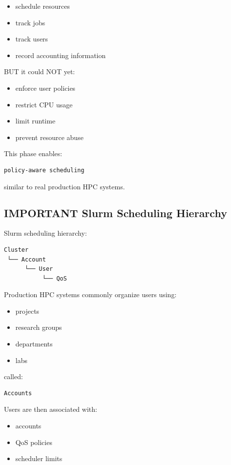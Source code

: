 \documentclass[11pt]{article}
\begin{document}
\begin{itemize}
\item schedule resources
\item track jobs
\item track users
\item record accounting information
\end{itemize}

BUT it could NOT yet:

\begin{itemize}
\item enforce user policies
\item restrict CPU usage
\item limit runtime
\item prevent resource abuse
\end{itemize}

This phase enables:

\begin{verbatim}
policy-aware scheduling
\end{verbatim}

similar to real production HPC systems.
\subsection{IMPORTANT Slurm Scheduling Hierarchy}
\label{sec:orga606759}

Slurm scheduling hierarchy:

\begin{verbatim}
Cluster
 └── Account
      └── User
           └── QoS
\end{verbatim}

Production HPC systems commonly organize users using:

\begin{itemize}
\item projects
\item research groups
\item departments
\item labs
\end{itemize}

called:

\begin{verbatim}
Accounts
\end{verbatim}

Users are then associated with:

\begin{itemize}
\item accounts
\item QoS policies
\item scheduler limits
\end{itemize}
\end{document}
